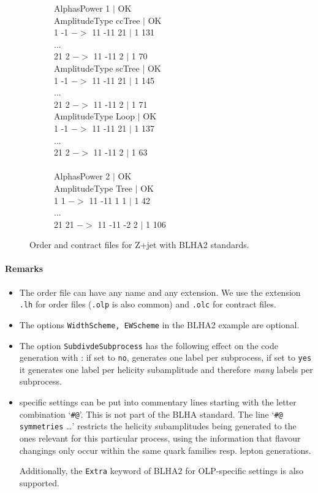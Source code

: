 \begin{figure}[h]
\begin{subfigure}[]{0.49\textwidth}
{{AlphasPower 1 $|$ OK\\
AmplitudeType ccTree $|$ OK\\
1 -1 $->$ 11 -11 21 $|$ 1 131\\
...\\
21 2 $->$ 11 -11 2 $|$ 1 70\\
AmplitudeType scTree | OK\\
1 -1 $->$ 11 -11 21 $|$ 1 145\\
...\\
21 2 $->$ 11 -11 2 $|$ 1 71\\
AmplitudeType Loop $|$ OK\\
1 -1 $->$ 11 -11 21 $|$ 1 137\\
...\\
21 2 $->$ 11 -11 2 $|$ 1 63\\
\\
AlphasPower 2 $|$ OK\\
AmplitudeType Tree $|$ OK\\
1 1 $->$ 11 -11 1 1 $|$ 1 42\\
...\\
21 21 $->$ 11 -11 -2 2 $|$ 1 106\\}
}
\end{subfigure}
\caption{Order and contract files for Z+jet with BLHA2 standards.}
\label{fig:BLHA2}
\end{figure}  

\paragraph{Remarks}
\begin{itemize}
\item The order file can have any name and any extension.
      We use  the extension \texttt{.lh}
      for order files (\texttt{.olp} is also common) and \texttt{.olc} for contract files.
\item The options \texttt{WidthScheme, EWScheme} in the BLHA2  example are optional.
\item The option \texttt{SubdivdeSubprocess}  has the following effect
      on the code generation with \gosam{}: if set to 
      \texttt{no}, \gosam{} generates one label per subprocess, if set to
      \texttt{yes} it generates one label per helicity subamplitude
      and therefore \emph{many} labels per subprocess.
      
\item \gosam{} specific settings can be put into commentary lines starting
      with the letter combination `\texttt{\#@}'. This is not part of the
      BLHA standard. The line `\texttt{\#@ symmetries} \dots' restricts the
      helicity subamplitudes being generated to the ones relevant for this
      particular process, using the information that flavour changings only occur within 
      the same quark families resp. lepton generations.

      Additionally, the \texttt{Extra} keyword of BLHA2 for OLP-specific settings is also supported.
\end{itemize}


